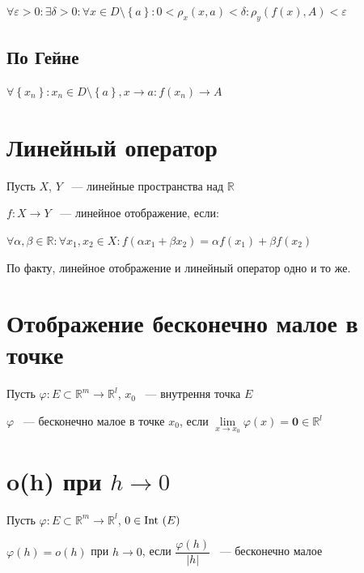 \documentclass{article}
\begin{document}
            $\forall \varepsilon > 0 : \exists \delta > 0 : \forall x \in D \setminus \left\{a \right\} : 0 < \rho_x (x, a) < \delta : \rho_y (f(x), A) < \varepsilon$
            
        \subsection{По Гейне}
        
            $\forall \left\{ x_n \right\} : x_n \in D \setminus \left\{ a \right\}, x \rightarrow a : f(x_n) \rightarrow A$
            
    \newpage
    
    \section{Линейный оператор}
    
        Пусть $X$, $Y$ ~--- линейные пространства над $\mathbb{R}$
        
        $f: X \rightarrow Y$ ~--- линейное отображение, если:
        
        $\forall \alpha, \beta \in \mathbb{R} : \forall x_1, x_2 \in X : f(\alpha x_1 + \beta x_2) = \alpha f(x_1) + \beta f(x_2)$
        
        По факту, линейное отображение и линейный оператор одно и то же.
        
    \newpage
    
    \section{Отображение бесконечно малое в точке}
    
        Пусть $\varphi : E \subset \mathbb{R}^m \rightarrow \mathbb{R}^l$, $x_0$ ~--- внутрення точка $E$
        
        $\varphi$ ~--- бесконечно малое в точке $x_0$, если $\lim\limits_{x \rightarrow x_0} \varphi(x) = \mathbf{0} \in \mathbb{R}^l$
        
    \newpage
    
    \section{o(h) при $h \rightarrow 0$}
    
        Пусть $\varphi : E \subset \mathbb{R}^m \rightarrow \mathbb{R}^l$, $0 \in \Int(E)$
        
        $\varphi(h) = o(h)$ при $h \rightarrow 0$, если $\dfrac{\varphi(h)}{| h |}$ ~--- бесконечно малое
        
\end{document}
